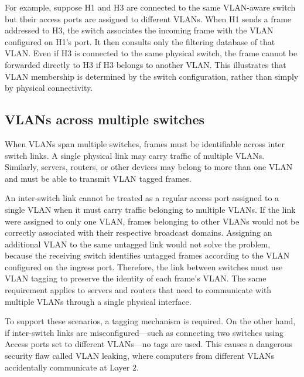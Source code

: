 \begin{center}
\end{center}


For example, suppose H1 and H3 are connected to the same VLAN-aware switch but their access ports are assigned to different VLANs. When H1 sends a frame addressed to H3, the switch associates the incoming frame with the VLAN configured on H1's port. It then consults only the filtering database of that VLAN. Even if H3 is connected to the same physical switch, the frame cannot be forwarded directly to H3 if H3 belongs to another VLAN. This illustrates that VLAN membership is determined by the switch configuration, rather than simply by physical connectivity.
\subsection{VLANs across multiple switches}

When VLANs span multiple switches, frames must be identifiable across inter switch links. A single physical link may carry traffic of multiple VLANs. Similarly, servers, routers, or other devices may belong to more than one VLAN and must be able to transmit VLAN tagged frames.

An inter-switch link cannot be treated as a regular access port assigned to a single VLAN when it must carry traffic belonging to multiple VLANs. If the link were assigned to only one VLAN, frames belonging to other VLANs would not be correctly associated with their respective broadcast domains. Assigning an additional VLAN to the same untagged link would not solve the problem, because the receiving switch identifies untagged frames according to the VLAN configured on the ingress port. Therefore, the link between switches must use VLAN tagging to preserve the identity of each frame's VLAN. The same requirement applies to servers and routers that need to communicate with multiple VLANs through a single physical interface.
\begin{center}
\end{center}

 To support these scenarios, a tagging mechanism is required. On the other hand, if inter-switch links are misconfigured—such as connecting two switches using Access ports set to different VLANs—no tags are used. This causes a dangerous security flaw called VLAN leaking, where computers from different VLANs accidentally communicate at Layer 2.

